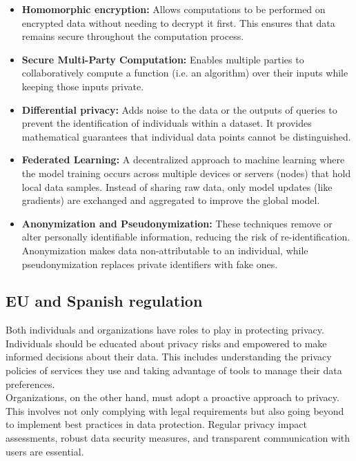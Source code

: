 \begin{itemize}
    \item \textbf{Homomorphic encryption:} Allows computations to be performed on encrypted data without needing to decrypt it first. This ensures that data remains secure throughout the computation process.
    \item \textbf{Secure Multi-Party Computation:} Enables multiple parties to collaboratively compute a function (i.e. an algorithm) over their inputs while keeping those inputs private.
    \item \textbf{Differential privacy:} Adds noise to the data or the outputs of queries to prevent the identification of individuals within a dataset. It provides mathematical guarantees that individual data points cannot be distinguished.
    \item \textbf{Federated Learning:} A decentralized approach to machine learning where the model training occurs across multiple devices or servers (nodes) that hold local data samples. Instead of sharing raw data, only model updates (like gradients) are exchanged and aggregated to improve the global model.
    \item \textbf{Anonymization and Pseudonymization:} These techniques remove or alter personally identifiable information, reducing the risk of re-identification. Anonymization makes data non-attributable to an individual, while pseudonymization replaces private identifiers with fake ones.
\end{itemize}



\subsection{EU and Spanish regulation}
Both individuals and organizations have roles to play in protecting privacy. Individuals should be educated about privacy risks and empowered to make informed decisions about their data. This includes understanding the privacy policies of services they use and taking advantage of tools to manage their data preferences.\\
Organizations, on the other hand, must adopt a proactive approach to privacy. This involves not only complying with legal requirements but also going beyond to implement best practices in data protection. Regular privacy impact assessments, robust data security measures, and transparent communication with users are essential.

